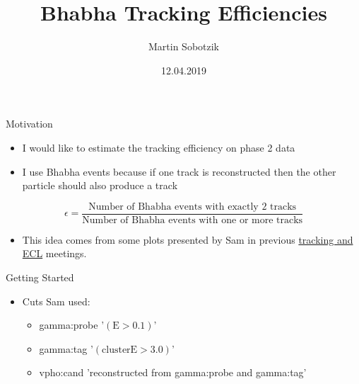 \documentclass[10pt]{beamer}
\title{Bhabha Tracking Efficiencies}
\date{12.04.2019}
\author{Martin Sobotzik}
\institute{Johannes Gutenberg Universit\"at Mainz}
\begin{document}
\maketitle
{%



\begin{frame}{Motivation}

\begin{itemize}	
	\item I would like to estimate the tracking efficiency on phase 2 data
	\item I use Bhabha events because if one track is reconstructed then the other particle should also produce a track

\end{itemize}
	\begin{equation*}
		\epsilon = \frac{\textrm{Number of Bhabha events with exactly 2 tracks}}{\textrm{Number of Bhabha events with one or more tracks}}
	\end{equation*}
	
	\begin{itemize}
		\item  This idea comes from some plots presented by Sam in previous  \href{https://confluence.desy.de/display/BI/ECL+Meetings?preview=/84320165/109161400/SCunliffe181123-ECL.pdf}{tracking and ECL} meetings.
	\end{itemize}





\end{frame}
	
\begin{frame}{Getting Started}
	
\begin{itemize} 
	\item Cuts Sam used:
	
	
	\begin{itemize}
		\item gamma:probe '$(\textrm{E} > 0.1 )$'
		\item gamma:tag '$(\textrm{clusterE} > 3.0)$'
		\item vpho:cand 'reconstructed from gamma:probe and gamma:tag'
	\end{itemize}


\end{itemize}
\end{frame}}
\end{document}
